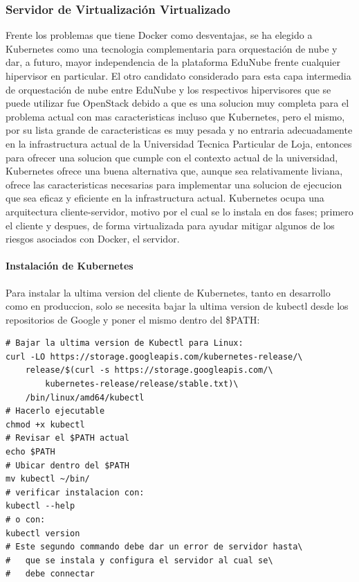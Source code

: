 \subsubsection{Servidor de Virtualización Virtualizado}
Frente los problemas que tiene Docker como desventajas, se ha elegido a Kubernetes como una tecnologia complementaria para orquestación de nube y dar, a futuro, mayor independencia de la plataforma EduNube frente cualquier hipervisor en particular. El otro candidato considerado para esta capa intermedia de orquestación de nube entre EduNube y los respectivos hipervisores que se puede utilizar fue OpenStack debido a que es una solucion muy completa para el problema actual con mas caracteristicas incluso que Kubernetes, pero el mismo, por su lista grande de caracteristicas es muy pesada y no entraria adecuadamente en la infrastructura actual de la Universidad Tecnica Particular de Loja, entonces para ofrecer una solucion que cumple con el contexto actual de la universidad, Kubernetes ofrece una buena alternativa que, aunque sea relativamente liviana, ofrece las caracteristicas necesarias para implementar una solucion de ejecucion que sea eficaz y eficiente en la infrastructura actual. Kubernetes ocupa una arquitectura cliente-servidor, motivo por el cual se lo instala en dos fases; primero el cliente y despues, de forma virtualizada para ayudar mitigar algunos de los riesgos asociados con Docker, el servidor. 

\paragraph{Instalación de Kubernetes}
Para instalar la ultima version del cliente de Kubernetes, tanto en desarrollo como en produccion, solo se necesita bajar la ultima version de kubectl desde los repositorios de Google y poner el mismo dentro del \$PATH:
\begin{lstlisting}
# Bajar la ultima version de Kubectl para Linux:
curl -LO https://storage.googleapis.com/kubernetes-release/\
	release/$(curl -s https://storage.googleapis.com/\
    	kubernetes-release/release/stable.txt)\
	/bin/linux/amd64/kubectl
# Hacerlo ejecutable
chmod +x kubectl
# Revisar el $PATH actual
echo $PATH
# Ubicar dentro del $PATH
mv kubectl ~/bin/
# verificar instalacion con:
kubectl --help
# o con:
kubectl version
# Este segundo commando debe dar un error de servidor hasta\
#	que se instala y configura el servidor al cual se\
#	debe connectar
\end{lstlisting}

